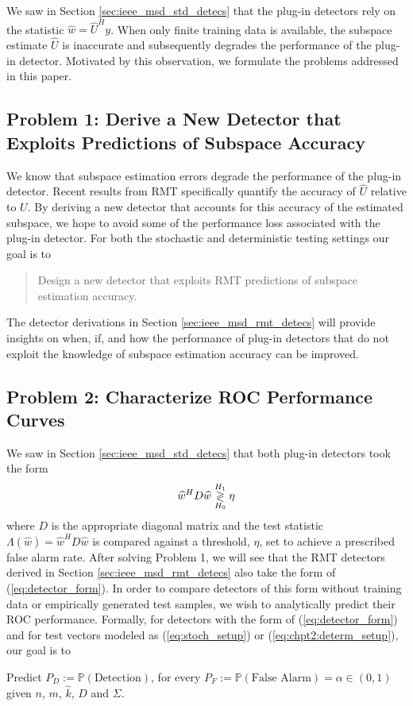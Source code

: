 We saw in Section \ref{sec:ieee_msd_std_detecs} that the plug-in detectors rely on the statistic $\widehat{w}=\widehat{U}^Hy$. When only finite training data is available, the subspace estimate $\widehat{U}$ is inaccurate and subsequently degrades the performance of the plug-in detector. Motivated by this observation, we formulate the problems addressed in this paper.

\subsection{Problem 1: Derive a New Detector that Exploits Predictions of Subspace Accuracy}\label{sec:ieee_msd_ps_prob2}

We know that subspace estimation errors degrade the performance of the plug-in detector. Recent results from RMT specifically quantify the accuracy of $\widehat{U}$ relative to $U$. By deriving a new detector that accounts for this accuracy of the estimated subspace, we hope to avoid some of the performance loss associated with the plug-in detector. For both the stochastic and deterministic testing settings our goal is to 
\begin{quote}
Design a new detector that exploits RMT predictions of subspace estimation accuracy.
\end{quote}
The detector derivations in Section \ref{sec:ieee_msd_rmt_detecs} will provide insights on when, if, and how the performance of plug-in detectors that do not exploit the knowledge of subspace estimation accuracy can be improved.
 
\subsection{Problem 2: Characterize ROC Performance Curves}\label{sec:ieee_msd_problem_1}

We saw in Section \ref{sec:ieee_msd_std_detecs} that both plug-in detectors took the form
\begin{equation}\label{eq:detector_form}
\widehat{w}^HD\widehat{w}\detgtrless\eta
\end{equation}
where $D$ is the appropriate diagonal matrix and the test statistic $\Lambda(\widehat{w})=\widehat{w}^HD\widehat{w}$ is compared against a threshold, $\eta$, set to achieve a prescribed false alarm rate. After solving Problem 1, we will see that the RMT detectors derived in Section \ref{sec:ieee_msd_rmt_detecs} also take the form of (\ref{eq:detector_form}). In order to compare detectors of this form without training data or empirically generated test samples, we wish to analytically predict their ROC performance. Formally, for detectors with the form of (\ref{eq:detector_form}) and for test vectors modeled as (\ref{eq:stoch_setup}) or (\ref{eq:chpt2:determ_setup}), our goal is to
\begin{center}
Predict $P_D:=\mathbb{P}(\text{Detection})$, for every $P_F:=\mathbb{P}(\text{False Alarm})=\alpha \in (0,1)$ given $n$, $m$, $\widehat{k}$, $D$ and $\Sigma$.
\end{center}

